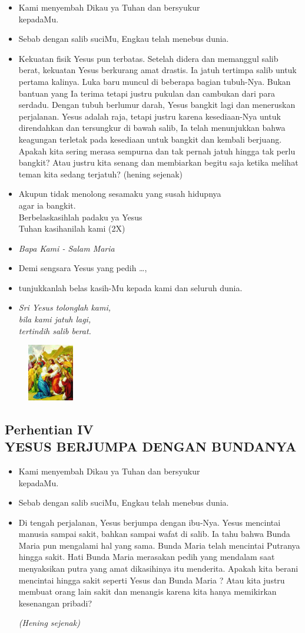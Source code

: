 \documentclass[a5paper,headsepline,titlepage,11pt,nnormalheadings,DIVcalc]{scrbook}
\newcommand{\BU}[1]{\begin{itemize} \item[U:] #1 \end{itemize}}
\newcommand{\BP}[1]{\begin{itemize} \item[P:] #1 \end{itemize}}
\newcommand{\kamiMenyembah}{\BP{ Kami menyembah Dikau ya Tuhan dan bersyukur\\kepadaMu.}
\BU{ Sebab dengan salib suciMu, Engkau telah menebus dunia.}
}
\newcommand{\kasihanilahKami}{\BP{Demi sengsara Yesus yang pedih \ldots,}
\BU{tunjukkanlah belas kasih-Mu kepada kami dan seluruh dunia.}}
\def\hening{\par \textit{(Hening sejenak)}}
\begin{document}
\kamiMenyembah
\BP{Kekuatan fisik Yesus pun terbatas. Setelah didera dan memanggul salib berat, kekuatan Yesus berkurang amat drastis. Ia jatuh tertimpa salib untuk pertama kalinya. Luka baru muncul di beberapa bagian tubuh-Nya. Bukan bantuan yang Ia terima tetapi justru pukulan dan cambukan dari para serdadu. Dengan tubuh berlumur darah, Yesus bangkit lagi dan meneruskan perjalanan. Yesus adalah raja, tetapi justru karena kesediaan-Nya untuk direndahkan dan tersungkur di bawah salib, Ia telah menunjukkan bahwa keagungan terletak pada kesediaan untuk bangkit dan kembali berjuang. Apakah kita sering merasa sempurna dan tak pernah jatuh hingga tak perlu bangkit? Atau justru kita senang dan membiarkan begitu saja ketika melihat teman kita sedang terjatuh?
(hening sejenak)
}

\BU{Akupun tidak menolong sesamaku yang susah hidupnya\\ agar ia bangkit. \\Berbelaskasihlah padaku ya Yesus\\
 Tuhan kasihanilah kami (2X)
}

\large\begin{itemize}\item[~]\it{Bapa Kami - Salam Maria}\end{itemize}\normalsize
\kasihanilahKami

\begin{itemize}
\item[4.] \it{Sri Yesus tolonglah kami, \\
	bila kami jatuh lagi,\\ 
	tertindih salib berat.}
\end{itemize}

\begin{figure}
\includegraphics[width=2cm]{jalansalib_files/04_small.jpg}
\end{figure}
\subsection*{Perhentian IV\\
YESUS BERJUMPA DENGAN BUNDANYA}

\kamiMenyembah
\BP{Di tengah perjalanan, Yesus berjumpa dengan ibu-Nya.  Yesus mencintai manusia sampai sakit, bahkan sampai wafat di salib. Ia tahu bahwa Bunda Maria pun mengalami hal yang sama. Bunda Maria telah mencintai Putranya hingga sakit. Hati Bunda Maria merasakan pedih yang mendalam saat menyaksikan putra yang amat dikasihinya itu menderita. Apakah kita berani mencintai hingga sakit seperti Yesus dan Bunda Maria ? Atau kita justru membuat orang lain sakit dan menangis karena kita hanya memikirkan kesenangan pribadi?
\hening
}
\end{document}
